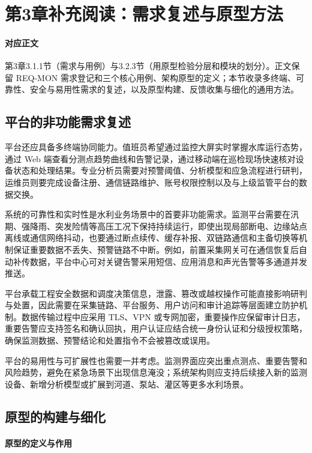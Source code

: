 \section{第3章补充阅读：需求复述与原型方法}\label{online:ch03}

\paragraph{对应正文}第3章3.1.1节（需求与用例）与3.2.3节（用原型检验分层和模块的划分）。正文保留 REQ-MON 需求登记和三个核心用例、架构原型的定义；本节收录多终端、可靠性、安全与易用性需求的复述，以及原型构建、反馈收集与细化的通用方法。

\subsection{平台的非功能需求复述}

平台还应具备多终端协同能力。值班员希望通过监控大屏实时掌握水库运行态势，通过 Web 端查看分测点趋势曲线和告警记录，通过移动端在巡检现场快速核对设备状态和处理结果。专业分析员需要对预警阈值、分析模型和应急流程进行研判，运维员则要完成设备注册、通信链路维护、账号权限控制以及与上级监管平台的数据交换。

系统的可靠性和实时性是水利业务场景中的首要非功能需求。监测平台需要在汛期、强降雨、突发险情等高压工况下保持持续运行，即使出现局部断电、边缘站点离线或通信网络抖动，也要通过断点续传、缓存补报、双链路通信和主备切换等机制保证重要数据不丢失、预警链路不中断。例如，前置采集网关可在通信恢复后自动补传数据，平台中心可对关键告警采用短信、应用消息和声光告警等多通道并发推送。

平台承载工程安全数据和调度决策信息，泄露、篡改或越权操作可能直接影响研判与处置，因此需要在采集链路、平台服务、用户访问和审计追踪等层面建立防护机制。数据传输过程中应采用 TLS、VPN 或专网加密，重要操作应保留审计日志，重要告警应支持签名和确认回执，用户认证应结合统一身份认证和分级授权策略，确保监测数据、预警结论和处置指令不会被篡改或误用。

平台的易用性与可扩展性也需要一并考虑。监测界面应突出重点测点、重要告警和风险趋势，避免在紧急场景下出现信息淹没；系统架构则应支持后续接入新的监测设备、新增分析模型或扩展到河道、泵站、灌区等更多水利场景。

\subsection{原型的构建与细化}

\paragraph{原型的定义与作用}

